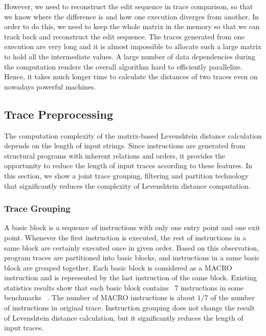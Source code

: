 \documentclass[10pt,journal,cspaper,compsoc]{IEEEtran}
\begin{document}

However, we need to reconstruct the edit sequence in trace
comparison, so that we know where the difference is and how one
execution diverges from another. In order to do this, we need to
keep the whole matrix in the memory so that we can track back and
reconstruct the edit sequence. The traces generated from one
execution are very long and it is almost impossible to allocate such a large matrix
to hold all the intermediate values. A large number of data
dependencies during the computation renders the overall algorithm
hard to efficiently parallelize. Hence, it takes much longer time to
calculate the distances of two traces even on nowadays powerful
machines.

\subsection{Trace Preprocessing}
The computation complexity of the matrix-based Levenshtein distance
calculation depends on the length of input strings. Since
instructions are generated from structural programs with inherent
relations and orders, it provides the opportunity to reduce the
length of input traces according to these features. In this section,
we show a joint trace grouping, filtering and partition technology
that significantly reduces the complexity of Levenshtein
distance computation.

\subsubsection{Trace Grouping}
A basic block is a sequence of instructions with only one entry
point and one exit point. Whenever the first instruction is
executed, the rest of instructions in a same block are certainly
executed once in given order. Based on this observation, program
traces are partitioned into basic blocks, and instructions in a same
basic block are grouped together. Each basic block is considered as
a MACRO instruction and is represented by the last instruction of
the same block. Existing statistics results show that each basic
block contains ~7 instructions in some benchmarks ~\cite{CCPP}. The number
of MACRO instructions is about $1/7$ of the number of instructions
in original trace. Instruction grouping does not change the result
of Levenshtein distance calculation, but it significantly reduces
the length of input traces.
\end{document}
